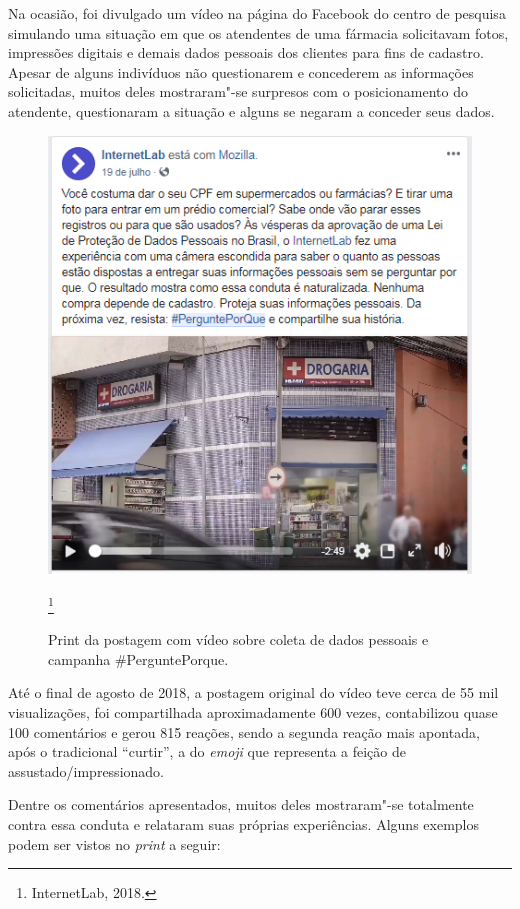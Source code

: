 Na ocasião, foi divulgado um vídeo na página do Facebook do centro de
pesquisa simulando uma situação em que os atendentes de uma fármacia
solicitavam fotos, impressões digitais e demais dados pessoais dos
clientes para fins de cadastro. Apesar de alguns indivíduos não
questionarem e concederem as informações solicitadas, muitos deles
mostraram"-se surpresos com o posicionamento do atendente, questionaram a
situação e alguns se negaram a conceder seus dados.

\begin{figure}[!ht]
\includegraphics[width=\textwidth]{./imgs/grafico5.png}
\caption{\formular\footnotesize{Print da postagem com vídeo sobre coleta de dados pessoais e campanha \#PerguntePorque.}}\footnote{InternetLab, 2018.}
\end{figure}

Até o final de agosto de 2018, a postagem original do vídeo teve cerca
de 55 mil visualizações, foi compartilhada aproximadamente 600 vezes,
contabilizou quase 100 comentários e gerou 815 reações, sendo a segunda
reação mais apontada, após o tradicional ``curtir'', a do \emph{emoji}
que representa a feição de assustado/impressionado.

Dentre os comentários apresentados, muitos deles mostraram"-se totalmente
contra essa conduta e relataram suas próprias experiências. Alguns
exemplos podem ser vistos no \emph{print} a seguir:


